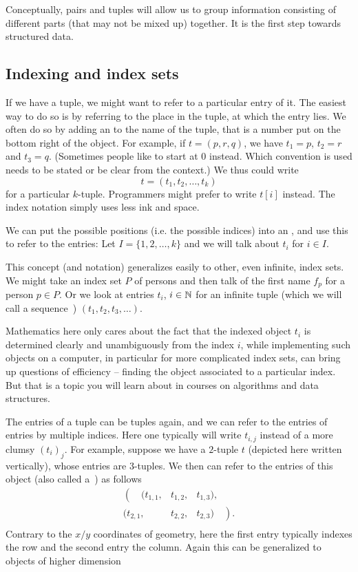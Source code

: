 Conceptually, pairs and tuples will allow us to group information consisting
of different parts (that may not be mixed up) together. It is the first step
towards structured data.

\subsection{Indexing and index sets}

If we have a tuple, we might want to refer to a
particular entry of it. The easiest way to do so is by referring to the
place in the tuple, at which the entry lies. We often do so by adding an
 to the name of the tuple,
that is a number put on the bottom right of the object. For
example, if $t=(p,r,q)$, we have $t_1=p$, $t_2=r$ and $t_3=q$. (Sometimes
people like to start at $0$ instead. Which convention is used needs to be
stated or be clear from the context.) We thus could write
\[
t=(t_1,t_2,\ldots,t_k)
\]
for a particular $k$-tuple. Programmers might prefer to write $t[i]$ instead. The
index notation simply uses less ink and space.
\smallskip

We can put the possible positions (i.e. the possible indices) into an
, and use this to refer to the entries: Let
$I=\{1,2,\ldots,k\}$ and we will talk about $t_i$
for $i\in I$.  
\smallskip

This concept (and notation) generalizes easily to other, even infinite, index
sets. We might take an index set $P$ of persons and then talk of the first
name $f_p$ for a person $p\in P$. Or we look at entries $t_i$, $i\in{\mathbb N}$ for
an infinite tuple (which we will call a sequence~)
$(t_1,t_2,t_3,\ldots)$.

Mathematics here only cares about the fact that the indexed object $t_i$ is
determined clearly and unambiguously from the index $i$, while implementing
such objects on a computer, in particular for more complicated index sets,
can bring up questions of efficiency -- finding the object associated to a
particular index.  But that is a topic you will learn about in courses on
algorithms and data structures.
\medskip

The entries of a tuple can be tuples again, and we can refer to the entries
of entries by multiple indices. Here one typically will write $t_{i,j}$
instead of a more clumsy $(t_i)_j$.
For example, suppose we have a $2$-tuple $t$
(depicted here written vertically), whose entries are $3$-tuples. We then
can refer to the entries of this object (also called a~) as
follows
\[
\begin{array}{rcl}
\left(\quad(t_{1,1},\right.&t_{1,2},&t_{1,3}),\\
(t_{2,1},&t_{2,2},&t_{2,3})\left.\quad\right).\\
\end{array}
\]
Contrary to the $x/y$ coordinates of geometry, here the first entry
typically indexes the row and the second entry the column. Again this can
be generalized to objects of higher dimension

